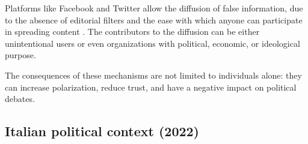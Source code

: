\medskip
Platforms like Facebook and Twitter allow the diffusion of false information, due to the absence of editorial filters and the ease with which anyone can participate in spreading content \cite{hilary2021social}.
The contributors to the diffusion can be either unintentional users or even organizations with political, economic, or ideological purpose.

The consequences of these mechanisms are not limited to individuals alone: they can increase polarization, reduce trust, and have a negative impact on political debates.









\subsection{Italian political context (2022)} %
